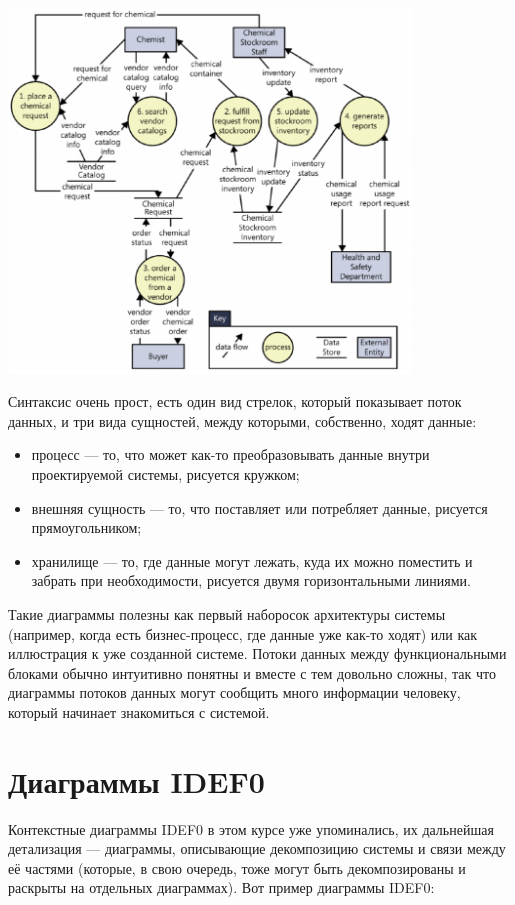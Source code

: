 \documentclass[a5paper]{article}
\begin{document}
\begin{center}
    \includegraphics[width=0.8\textwidth]{dfd.png}
\end{center}

Синтаксис очень прост, есть один вид стрелок, который показывает поток данных, и три вида сущностей, между которыми, собственно, ходят данные:

\begin{itemize}
    \item процесс --- то, что может как-то преобразовывать данные внутри проектируемой системы, рисуется кружком;
    \item внешняя сущность --- то, что поставляет или потребляет данные, рисуется прямоугольником;
    \item хранилище --- то, где данные могут лежать, куда их можно поместить и забрать при необходимости, рисуется двумя горизонтальными линиями.
\end{itemize}

Такие диаграммы полезны как первый наборосок архитектуры системы (например, когда есть бизнес-процесс, где данные уже как-то ходят) или как иллюстрация к уже созданной системе. Потоки данных между функциональными блоками обычно интуитивно понятны и вместе с тем довольно сложны, так что диаграммы потоков данных могут сообщить много информации человеку, который начинает знакомиться с системой.

\section{Диаграммы IDEF0}

Контекстные диаграммы IDEF0 в этом курсе уже упоминались, их дальнейшая детализация --- диаграммы, описывающие декомпозицию системы и связи между её частями (которые, в свою очередь, тоже могут быть декомпозированы и раскрыты на отдельных диаграммах). Вот пример диаграммы IDEF0:
\end{document}
